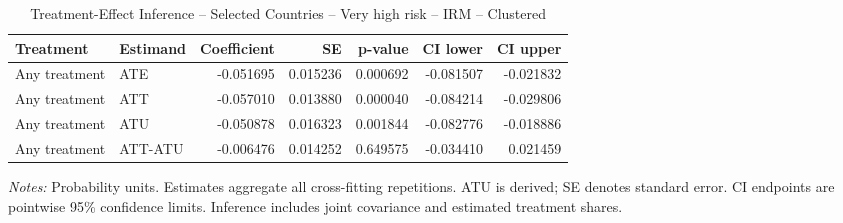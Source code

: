 \begin{table}[htbp]
\centering
\caption{Treatment-Effect Inference -- Selected Countries -- Very high risk -- IRM -- Clustered}
\label{tab:inference-VeryHighRiskHome-IRM-clustered-selected-countries}
\scriptsize
\begin{adjustbox}{max width=\linewidth}
\begin{tabular}{llrrrrr}
\toprule
Treatment & Estimand & Coefficient & SE & p-value & CI lower & CI upper \\
\midrule
Any treatment & ATE & -0.051695 & 0.015236 & 0.000692 & -0.081507 & -0.021832 \\
Any treatment & ATT & -0.057010 & 0.013880 & 0.000040 & -0.084214 & -0.029806 \\
Any treatment & ATU & -0.050878 & 0.016323 & 0.001844 & -0.082776 & -0.018886 \\
Any treatment & ATT-ATU & -0.006476 & 0.014252 & 0.649575 & -0.034410 & 0.021459 \\
\bottomrule
\end{tabular}

\end{adjustbox}
\par\smallskip
\begin{minipage}{\linewidth}\scriptsize \textit{Notes:} Probability units. Estimates aggregate all cross-fitting repetitions. ATU is derived; SE denotes standard error. CI endpoints are pointwise 95\% confidence limits. Inference includes joint covariance and estimated treatment shares. \end{minipage}
\end{table}

